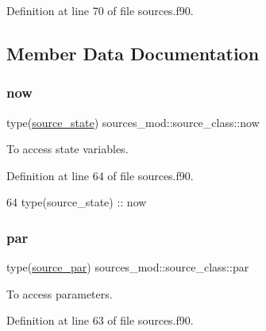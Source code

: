 Definition at line 70 of file sources.\+f90.



\subsection{Member Data Documentation}
\mbox{\label{structsources__mod_1_1source__class_aa79ef3a745f7e6e934acdda367e8995c}} 
\subsubsection{\texorpdfstring{now}{now}}
{\footnotesize\ttfamily type(\mbox{\hyperlink{structsources__mod_1_1source__state}{source\+\_\+state}}) sources\+\_\+mod\+::source\+\_\+class\+::now\hspace{0.3cm}{\ttfamily [private]}}



To access state variables. 



Definition at line 64 of file sources.\+f90.


\begin{DoxyCode}
64         \textcolor{keywordtype}{type}(source\_state) :: now
\end{DoxyCode}
\mbox{\label{structsources__mod_1_1source__class_a7dcca40df4b520fa207dbe93d7e49b2e}} 
\subsubsection{\texorpdfstring{par}{par}}
{\footnotesize\ttfamily type(\mbox{\hyperlink{structsources__mod_1_1source__par}{source\+\_\+par}}) sources\+\_\+mod\+::source\+\_\+class\+::par\hspace{0.3cm}{\ttfamily [private]}}



To access parameters. 



Definition at line 63 of file sources.\+f90.


